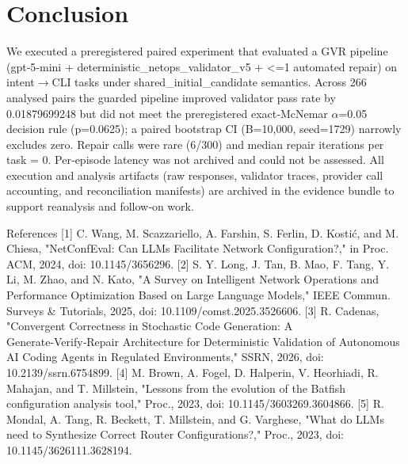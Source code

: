 \documentclass[conference]{IEEEtran}
\begin{document}
\section{Conclusion}
We executed a preregistered paired experiment that evaluated a GVR pipeline (gpt‑5‑mini + deterministic\_netops\_validator\_v5 + <=1 automated repair) on intent\ensuremath{\rightarrow}CLI tasks under shared\_initial\_candidate semantics. Across 266 analysed pairs the guarded pipeline improved validator pass rate by 0.01879699248 but did not meet the preregistered exact‑McNemar \ensuremath{\alpha}=0.05 decision rule (p=0.0625); a paired bootstrap CI (B=10,000, seed=1729) narrowly excludes zero. Repair calls were rare (6/300) and median repair iterations per task = 0. Per‑episode latency was not archived and could not be assessed. All execution and analysis artifacts (raw responses, validator traces, provider call accounting, and reconciliation manifests) are archived in the evidence bundle to support reanalysis and follow‑on work.

References
[1] C. Wang, M. Scazzariello, A. Farshin, S. Ferlin, D. Kostić, and M. Chiesa, "NetConfEval: Can LLMs Facilitate Network Configuration?," in Proc. ACM, 2024, doi: 10.1145/3656296.
[2] S. Y. Long, J. Tan, B. Mao, F. Tang, Y. Li, M. Zhao, and N. Kato, "A Survey on Intelligent Network Operations and Performance Optimization Based on Large Language Models," IEEE Commun. Surveys \& Tutorials, 2025, doi: 10.1109/comst.2025.3526606.
[3] R. Cadenas, "Convergent Correctness in Stochastic Code Generation: A Generate‑Verify‑Repair Architecture for Deterministic Validation of Autonomous AI Coding Agents in Regulated Environments," SSRN, 2026, doi: 10.2139/ssrn.6754899.
[4] M. Brown, A. Fogel, D. Halperin, V. Heorhiadi, R. Mahajan, and T. Millstein, "Lessons from the evolution of the Batfish configuration analysis tool," Proc., 2023, doi: 10.1145/3603269.3604866.
[5] R. Mondal, A. Tang, R. Beckett, T. Millstein, and G. Varghese, "What do LLMs need to Synthesize Correct Router Configurations?," Proc., 2023, doi: 10.1145/3626111.3628194.
\end{document}
